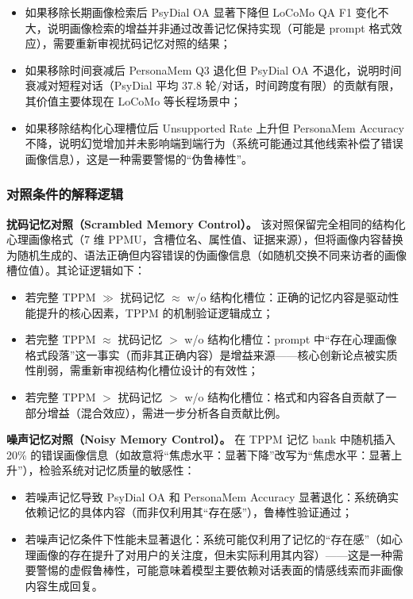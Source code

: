 \documentclass[12pt,a4paper]{article}
\begin{document}
\begin{itemize}
  \item 如果移除长期画像检索后 PsyDial OA 显著下降但 LoCoMo QA F1 变化不大，说明画像检索的增益并非通过改善记忆保持实现（可能是 prompt 格式效应），需要重新审视扰码记忆对照的结果；
  \item 如果移除时间衰减后 PersonaMem Q3 退化但 PsyDial OA 不退化，说明时间衰减对短程对话（PsyDial 平均 37.8 轮/对话，时间跨度有限）的贡献有限，其价值主要体现在 LoCoMo 等长程场景中；
  \item 如果移除结构化心理槽位后 Unsupported Rate 上升但 PersonaMem Accuracy 不降，说明幻觉增加并未影响端到端行为（系统可能通过其他线索补偿了错误画像信息），这是一种需要警惕的``伪鲁棒性''。
\end{itemize}

\subsubsection{对照条件的解释逻辑}

\textbf{扰码记忆对照（Scrambled Memory Control）。} 该对照保留完全相同的结构化心理画像格式（7 维 PPMU，含槽位名、属性值、证据来源），但将画像内容替换为随机生成的、语法正确但内容错误的伪画像信息（如随机交换不同来访者的画像槽位值）。其论证逻辑如下：

\begin{itemize}
  \item 若完整 TPPM $\gg$ 扰码记忆 $\approx$ w/o 结构化槽位：正确的记忆内容是驱动性能提升的核心因素，TPPM 的机制验证逻辑成立；
  \item 若完整 TPPM $\approx$ 扰码记忆 $>$ w/o 结构化槽位：prompt 中``存在心理画像格式段落''这一事实（而非其正确内容）是增益来源——核心创新论点被实质性削弱，需重新审视结构化槽位设计的有效性；
  \item 若完整 TPPM $>$ 扰码记忆 $>$ w/o 结构化槽位：格式和内容各自贡献了一部分增益（混合效应），需进一步分析各自贡献比例。
\end{itemize}

\textbf{噪声记忆对照（Noisy Memory Control）。} 在 TPPM 记忆 bank 中随机插入 20\% 的错误画像信息（如故意将``焦虑水平：显著下降''改写为``焦虑水平：显著上升''），检验系统对记忆质量的敏感性：

\begin{itemize}
  \item 若噪声记忆导致 PsyDial OA 和 PersonaMem Accuracy 显著退化：系统确实依赖记忆的具体内容（而非仅利用其``存在感''），鲁棒性验证通过；
  \item 若噪声记忆条件下性能未显著退化：系统可能仅利用了记忆的``存在感''（如心理画像的存在提升了对用户的关注度，但未实际利用其内容）——这是一种需要警惕的虚假鲁棒性，可能意味着模型主要依赖对话表面的情感线索而非画像内容生成回复。
\end{itemize}
\end{document}
